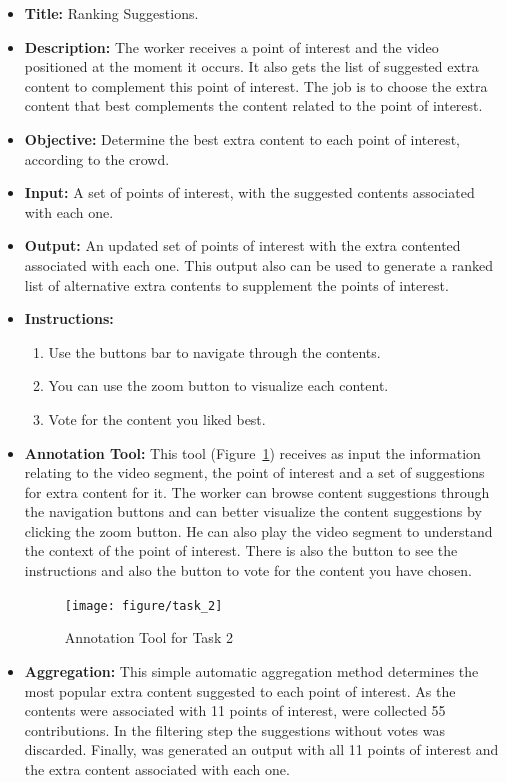 \begin{itemize}

\item \textbf{Title:} Ranking Suggestions.

\item \textbf{Description:} The worker receives a point of interest and the video positioned at the moment it occurs. It also gets the list of suggested extra content to complement this point of interest. The job is to choose the extra content that best complements the content related to the point of interest.

\item \textbf{Objective:} Determine the best extra content to each point of interest, according to the crowd.


\item \textbf{Input:} A set of points of interest, with the suggested contents associated with each one.


\item \textbf{Output:} An updated set of points of interest with the extra contented associated with each one. This output also can be used to generate a ranked list of alternative extra contents to supplement the points of interest.


\item \textbf{Instructions:} \begin{enumerate}
	\item Use the buttons bar to navigate through the contents.
	\item You can use the zoom button to visualize each content.
	\item Vote for the content you liked best.
\end{enumerate}

\pagebreak

\item \textbf{Annotation Tool:} This tool (Figure~\ref{task_2}) receives as input the information relating to the video segment, the point of interest and a set of suggestions for extra content for it. The worker can browse content suggestions through the navigation buttons and can better visualize the content suggestions by clicking the zoom button. He can also play the video segment to understand the context of the point of interest. There is also the button to see the instructions and also the button to vote for the content you have chosen.

\begin{figure}[h!]
	\centerline{\texttt{[image: figure/task\_2]}}
	\caption{Annotation Tool for Task 2}
	\label{task_2}
\end{figure}

\item \textbf{Aggregation:} This simple automatic aggregation method determines the most popular extra content suggested to each point of interest. As the contents were associated with 11 points of interest, were collected 55 contributions. In the filtering step the suggestions without votes was discarded. Finally, was generated an output with all 11 points of interest and the extra content associated with each one. 

\end{itemize}



